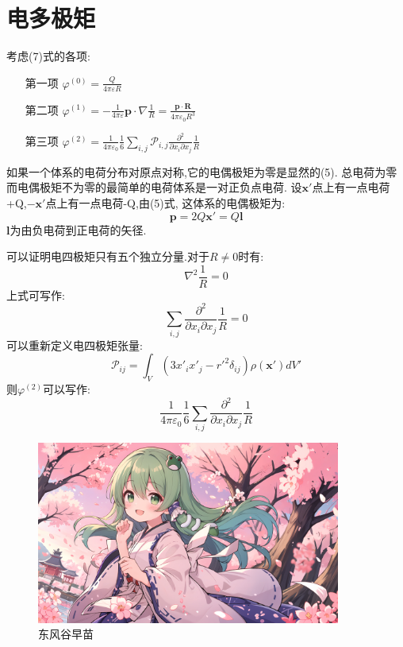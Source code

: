 \documentclass{ctexart}
\begin{document}
\section{电多极矩}
考虑(7)式的各项:
\begin{itemize}
    \item[第一项]$\varphi^{(0)}=\frac{Q}{4\pi\varepsilon R}$
    \item[第二项]$\varphi^{(1)}=-\frac{1}{4\pi\varepsilon}\mathbf{p}\cdot\nabla\frac{1}{R}=\frac{\mathbf{p}\cdot\mathbf{R}}{4\pi\varepsilon_{0} R^3}$
    \item[第三项]$\varphi^{(2)}=\frac{1}{4\pi\varepsilon_{0}}\frac{1}{6}\sum_{i,j}\mathcal{P}_{i,j}\frac{\partial^2}{\partial x_{i}\partial x_{j}}\frac{1}{R}$
\end{itemize}
如果一个体系的电荷分布对原点对称,它的电偶极矩为零是显然的(5).
总电荷为零而电偶极矩不为零的最简单的电荷体系是一对正负点电荷.
设$\mathbf{x'}$点上有一点电荷+Q,$\mathbf{-x'}$点上有一点电荷-Q,由(5)式,
这体系的电偶极矩为:
\begin{equation}
    \mathbf{p}=2Q\mathbf{x'}=Q\mathbf{l}
\end{equation}
$\mathbf{l}$为由负电荷到正电荷的矢径.


可以证明电四极矩只有五个独立分量.对于$R\neq 0$时有:
\begin{equation}
    \nabla^2\frac{1}{R}=0
\end{equation}
上式可写作:
\begin{equation}
    \sum_{i,j}\frac{\partial^2}{\partial x_{i}\partial x_{j}}\frac{1}{R}=0
\end{equation}
可以重新定义电四极矩张量:
\begin{equation}
    \mathcal{P}_{ij}=\int_{V}(3x'_{i}x'_{j}-r'^2\delta_{ij})\rho(\mathbf{x'})dV'
\end{equation}
则$\varphi^{(2)}$可以写作:
\begin{equation}
    \frac{1}{4\pi\varepsilon_{0}}\frac{1}{6}\sum_{i,j}\frac{\partial^2}{\partial x_{i}\partial x_{j}}\frac{1}{R}
\end{equation}




\begin{figure}[htbp]
\centering\includegraphics[width=10cm]{117204371_p0_master1200.jpg}
\caption{东风谷早苗}
\end{figure}
\end{document}
